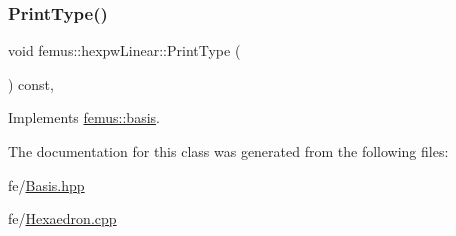 \subsubsection{\texorpdfstring{Print\+Type()}{PrintType()}}
{\footnotesize\ttfamily void femus\+::hexpw\+Linear\+::\+Print\+Type (\begin{DoxyParamCaption}{ }\end{DoxyParamCaption}) const\hspace{0.3cm}{\ttfamily [inline]}, {\ttfamily [virtual]}}



Implements \mbox{\hyperlink{classfemus_1_1basis_abbae7bf8f31ec5793c911bc6d4ea0572}{femus\+::basis}}.



The documentation for this class was generated from the following files\+:\begin{DoxyCompactItemize}
\item 
fe/\mbox{\hyperlink{_basis_8hpp}{Basis.\+hpp}}\item 
fe/\mbox{\hyperlink{_hexaedron_8cpp}{Hexaedron.\+cpp}}\end{DoxyCompactItemize}
